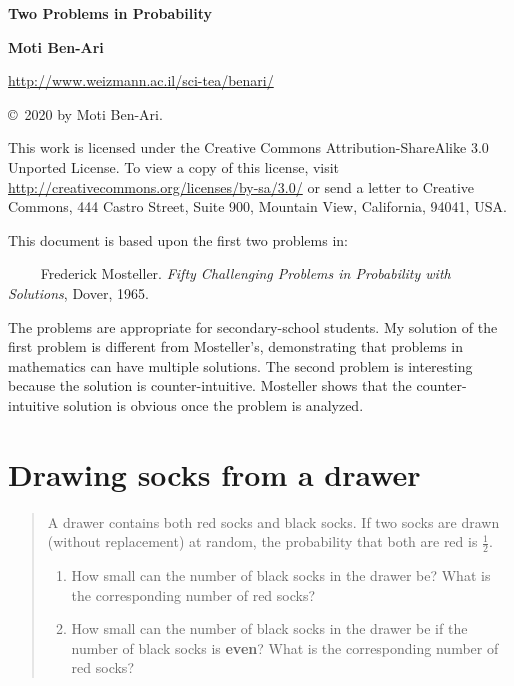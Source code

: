 \documentclass[11pt,a4paper]{article}
\begin{document}
\thispagestyle{empty}

\begin{center}
\textbf{\Large Two Problems in Probability}

\bigskip

\textbf{\large Moti Ben-Ari}
\bigskip

\url{http://www.weizmann.ac.il/sci-tea/benari/}
\end{center}

\begin{footnotesize}
\begin{center}
\copyright{}\ 2020 by Moti Ben-Ari.
\end{center}

This work is licensed under the Creative Commons Attribution-ShareAlike 3.0 Unported License. To view a copy of this license, visit \url{http://creativecommons.org/licenses/by-sa/3.0/} or send a letter to Creative Commons, 444 Castro Street, Suite 900, Mountain View, California, 94041, USA.
\end{footnotesize}

This document is based upon the first two problems in:

$\quad\quad$ Frederick Mosteller. \textit{Fifty Challenging Problems in Probability with Solutions}, Dover, 1965.

The problems are appropriate for secondary-school students. My solution of the first problem is different from Mosteller's, demonstrating that problems in mathematics can have multiple solutions. The second problem is interesting because the solution is counter-intuitive. Mosteller shows that the counter-intuitive solution is obvious once the problem is analyzed.

\section{Drawing socks from a drawer}

\begin{quote}
A drawer contains both red socks and black socks. If two socks are drawn (without replacement) at random, the probability that both are red is $\frac{1}{2}$. 
\begin{enumerate}
\item How small can the number of black socks in the drawer be? What is the corresponding number of red socks?
\item How small can the number of black socks in the drawer be if the number of black socks is \textbf{even}? What is the corresponding number of red socks?
\end{enumerate}
\end{quote}
\end{document}
